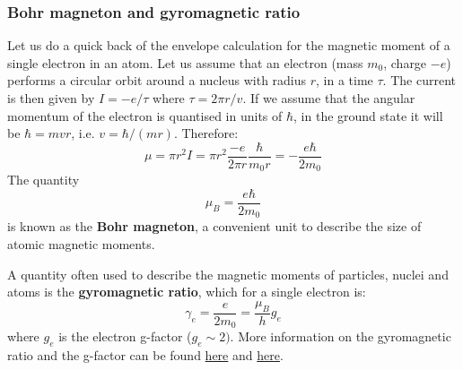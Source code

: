 \documentclass[a4paper,11pt]{article}
\begin{document}
\subsubsection{Bohr magneton and gyromagnetic ratio}
Let us do a quick back of the envelope calculation for the magnetic moment of a single electron in an atom. Let us assume that an electron (mass $m_0$, charge $-e$) performs a circular orbit around a nucleus with radius $r$, in a time $\tau$. The current is then given by $I = -e/\tau$ where $\tau = 2\pi r/v$.
\newline If we assume that the angular momentum of the electron is quantised in units of $\hbar$, in the ground state it will be $\hbar = mvr$, i.e. $v = \hbar/(mr)$. Therefore:
\begin{equation}
    \mu = \pi r^2 I = \pi r^2 \frac{-e}{2\pi r}\frac{\hbar}{m_0 r} = -\frac{e \hbar}{2m_0}
\end{equation}
The quantity
\begin{equation}
    \mu_B = \frac{e \hbar}{2m_0}
\end{equation}
is known as the {\bf Bohr magneton}, a convenient unit to describe the size of atomic magnetic moments.

A quantity often used to describe the magnetic moments of particles, nuclei and atoms is the {\bf gyromagnetic ratio}, which for a single electron is:
\begin{equation}
    \gamma_e = \frac{e}{2 m_0} = \frac{\mu_B}{h}g_e
\end{equation}
where $g_e$ is the electron g-factor ($g_e \sim 2)$. More information on the gyromagnetic ratio and the g-factor can be found \href{https://en.wikipedia.org/wiki/Gyromagnetic_ratio}{here} and \href{https://en.wikipedia.org/wiki/G-factor_(physics)}{here}.
\end{document}
